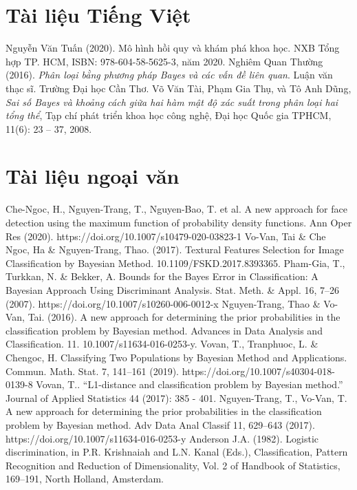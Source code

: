 \documentclass[a4paper,oneside]{report}			%
\theoremstyle{plain}
\theoremstyle{plain}
\theoremstyle{nonumberplain}
\begin{document}
\begin{thebibliography}{10}
	
	\section*{Tài liệu Tiếng Việt}

 Nguyễn Văn Tuấn (2020). Mô hình hồi quy và khám phá khoa học. NXB Tổng hợp TP. HCM, ISBN: 978-604-58-5625-3, năm 2020.
 Nghiêm Quan Thường (2016). \textit{Phân loại bằng phương pháp Bayes và các vấn đề liên quan}. Luận văn thạc sĩ. Trường Đại học Cần Thơ.
 Võ Văn Tài, Phạm  Gia  Thụ, và Tô Anh Dũng, \textit{Sai  số  Bayes  và  khoảng cách  giữa  hai hàm  mật độ xác suất trong phân loại hai tổng thể}, Tạp chí phát  triển khoa  học công nghệ, Đại học Quốc gia TPHCM, 11(6): 23 – 37, 2008. 

	\section*{Tài liệu ngoại văn}	
 Che-Ngoc, H., Nguyen-Trang, T., Nguyen-Bao, T. et al. A new approach for face detection using the maximum function of probability density functions. Ann Oper Res (2020). https://doi.org/10.1007/s10479-020-03823-1
 Vo-Van, Tai \& Che Ngoc, Ha \& Nguyen-Trang, Thao. (2017). Textural Features Selection for Image Classification by Bayesian Method. 10.1109/FSKD.2017.8393365.
 Pham-Gia, T., Turkkan, N. \& Bekker, A. Bounds for the Bayes Error in Classification: A Bayesian Approach Using Discriminant Analysis. Stat. Meth. \& Appl. 16, 7–26 (2007). https://doi.org/10.1007/s10260-006-0012-x
 Nguyen-Trang, Thao \& Vo-Van, Tai. (2016). A new approach for determining the prior probabilities in the classification problem by Bayesian method. Advances in Data Analysis and Classification. 11. 10.1007/s11634-016-0253-y. 
 Vovan, T., Tranphuoc, L. \& Chengoc, H. Classifying Two Populations by Bayesian Method and Applications. Commun. Math. Stat. 7, 141–161 (2019). https://doi.org/10.1007/s40304-018-0139-8
 Vovan, T.. “L1-distance and classification problem by Bayesian method.” Journal of Applied Statistics 44 (2017): 385 - 401.
 Nguyen-Trang, T., Vo-Van, T. A new approach for determining the prior probabilities in the classification problem by Bayesian method. Adv Data Anal Classif 11, 629–643 (2017). https://doi.org/10.1007/s11634-016-0253-y
 Anderson J.A. (1982). Logistic discrimination, in P.R. Krishnaiah and L.N. Kanal (Eds.), Classification, Pattern Recognition and Reduction of Dimensionality, Vol. 2 of Handbook of Statistics, 169–191, North Holland, Amsterdam.
\end{thebibliography}


\printindex
\end{document}
